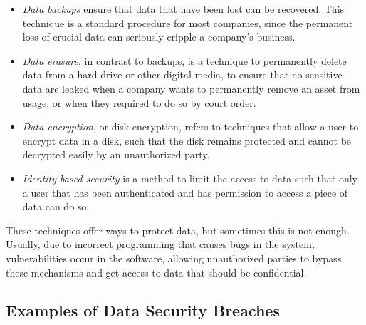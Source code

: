 \begin{itemize}

    \item \textit{Data backups} ensure that data that have been lost can be recovered. This technique is a standard procedure for most companies, since the permanent loss of crucial data can seriously cripple a company's business.

    \item \textit{Data erasure}, in contrast to backups, is a technique to permanently delete data from a hard drive or other digital media, to ensure that no sensitive data are leaked when a company wants to permanently remove an asset from usage, or when they required to do so by court order.

    \item \textit{Data encryption}, or disk encryption, refers to techniques that allow a user to encrypt data in a disk, such that the disk remains protected and cannot be decrypted easily by an unauthorized party.

    \item \textit{Identity-based security} is a method to limit the access to data such that only a user that has been authenticated and has permission to access a piece of data can do so.


\end{itemize}


These techniques offer ways to protect data, but sometimes this is not enough. Usually, due to incorrect programming that causes bugs in the system, vulnerabilities occur in the software, allowing unauthorized parties to bypass these mechanisms and get access to data that should be confidential.



\subsection{Examples of Data Security Breaches} 
\label{ssec:ExamplesDataSecurityBreaches}


